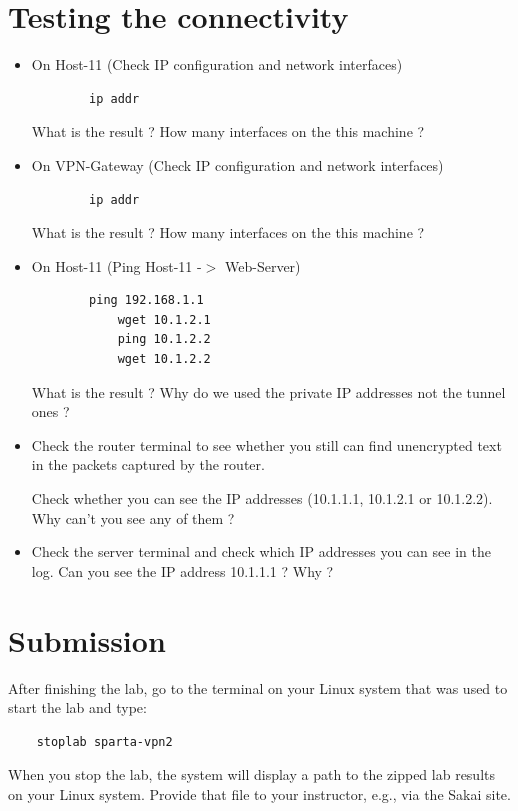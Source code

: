 \section{Testing the connectivity}
\begin{itemize}
	\item On Host-11 (Check IP configuration and network interfaces)
	\begin{verbatim}
	    ip addr
	\end{verbatim}

	What is the result ? How many interfaces on the this machine ?

	\item On VPN-Gateway (Check IP configuration and network interfaces)
	\begin{verbatim}
	    ip addr
	\end{verbatim}

	What is the result ? How many interfaces on the this machine ?

	\item On Host-11 (Ping Host-11 -$>$ Web-Server)
	\begin{verbatim}
	    ping 192.168.1.1
			wget 10.1.2.1
			ping 10.1.2.2
			wget 10.1.2.2
	\end{verbatim}

	What is the result ? Why do we used the private IP addresses not the tunnel ones ?

	\item Check the router terminal to see whether you still can find unencrypted text in the packets captured by the router.

	Check whether you can see the IP addresses (10.1.1.1, 10.1.2.1 or 10.1.2.2). Why can't you see any of them ?

	\item Check the server terminal and check which IP addresses you can see in the log. Can you see the IP address 10.1.1.1 ? Why ?

\end{itemize}

\section{Submission}
After finishing the lab, go to the terminal on your Linux system that was used to start the lab and type:
\begin{verbatim}
    stoplab sparta-vpn2
\end{verbatim}
When you stop the lab, the system will display a path to the zipped lab results on your Linux system.  Provide that file to
your instructor, e.g., via the Sakai site.


